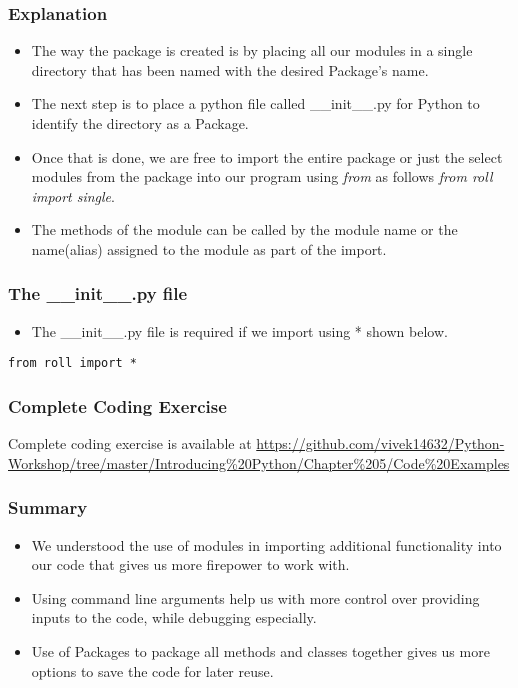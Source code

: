 \documentclass{beamer}
\begin{document}
\begin{frame}
\frametitle{Explanation}
\begin{itemize}
\item The way the package is created is by placing all our modules in a single directory that has been named with the desired Package's name.
\item The next step is to place a python file called \_\_init\_\_.py for Python to identify the directory as a Package.
\item Once that is done, we are free to import the entire package or just the select modules from the package into our program using \textit{from} as follows \textit{from roll import single}.
\item The methods of the module can be called by the module name or the name(alias) assigned to the module as part of the import.
\end{itemize}
\end{frame}

\begin{frame}[fragile]
\frametitle{The \_\_init\_\_.py file}
\begin{itemize}
\item The \_\_init\_\_.py file is required if we import using * shown below.
\end{itemize}

\begin{lstlisting}
from roll import *
\end{lstlisting}

\end{frame}


\begin{frame}
\frametitle{Complete Coding Exercise}
Complete coding exercise is available at \url{https://github.com/vivek14632/Python-Workshop/tree/master/Introducing\%20Python/Chapter\%205/Code\%20Examples}
\end{frame}


\begin{frame}
\frametitle{Summary}
\begin{itemize}
\item We understood the use of modules in importing additional functionality into our code that gives us more firepower to work with.
\item Using command line arguments help us with more control over providing inputs to the code, while debugging especially.
\item Use of Packages to package all methods and classes together gives us more options to save the code for later reuse.
\end{itemize}
\end{frame}
\end{document}
